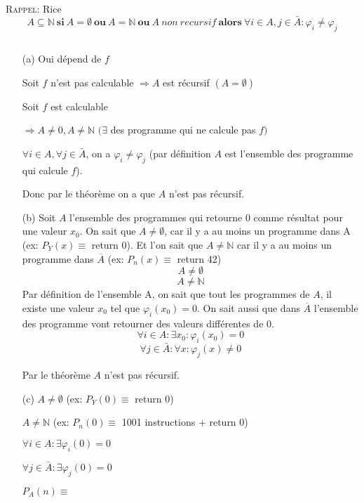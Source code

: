 \textsc{Rappel:} Rice
$$ A \subseteq \mathbb{N}\ \textbf{si}\ A = \emptyset\ \textbf{ou}\ A = \mathbb{N}\ \textbf{ou}\ A\ non\ recursif\ \textbf{alors}\  \forall i \in A, j \in \bar{A} : \varphi_i \neq \varphi_j$$

\subsection{}

\begin{itemize}
	\item[(a)] Oui dépend de $f$
	
	Soit $f$ n'est pas calculable $\Rightarrow A$ est récursif $(A = \emptyset)$
	
	Soit $f$ est calculable
	
	$\Rightarrow A \neq 0, A \neq \mathbb{N}$ $(\exists$ des programme qui ne calcule pas $f)$
	
	$\forall i \in A, \forall j \in \bar{A}$, on a $\varphi_i \neq \varphi_j$ (par définition $A$ est l'ensemble des programme qui calcule $f$).
	
	Donc par le théorème on a que $A$ n'est pas récursif.
	
	\item[(b)] Soit $A$ l'ensemble des programmes qui retourne 0 comme résultat pour une valeur $x_0$. On sait que $A \neq \emptyset$, car il y a au moins un programme dans A (ex: $P_Y(x) \equiv$ return 0). Et l'on sait que  $A \neq \mathbb{N}$ car il y a au moins un programme dans $\overline{A}$ (ex: $P_n(x) \equiv$ return 42)
	$$A \neq \emptyset$$
	$$A \neq \mathbb{N}$$
	Par définition de l'ensemble A, on sait que tout les programmes de $A$, il existe une valeur $x_0$ tel que $\varphi_i(x_0) = 0$. On sait aussi que dans $\overline{A}$ l'ensemble des programme vont retourner des valeurs différentes de 0.
	$$\forall i \in A : \exists x_0 : \varphi_i(x_0) = 0$$
	$$\forall j \in \bar{A} : \forall x : \varphi_j(x) \neq 0$$
	
	Par le théorème $A$ n'est pas récursif.
	
	\item[(c)] $A \neq \emptyset$ (ex: $P_Y(0) \equiv$ return 0)
	
	$A \neq \mathbb{N}$ (ex: $P_n(0) \equiv$ 1001 instructions + return 0)
	
	$\forall i \in A : \exists \varphi_i(0) = 0$
	
	$\forall j \in \bar{A} : \exists \varphi_j(0) = 0$
	
	$P_A(n) \equiv$
	

\end{itemize}
